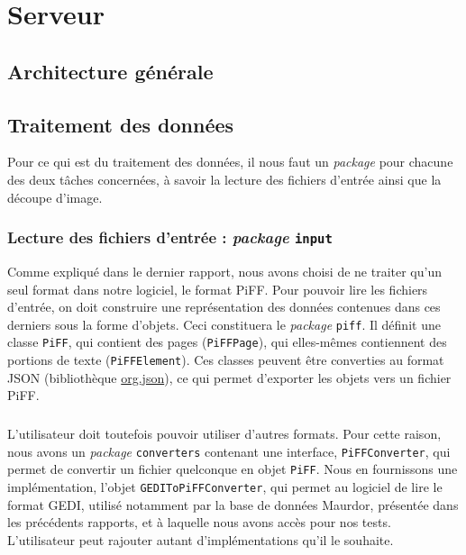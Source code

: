 \chapter{Serveur}

\section{Architecture générale}

\section{Traitement des données}

Pour ce qui est du traitement des données, il nous faut un \textit{package} pour chacune des deux tâches concernées, à savoir la lecture des fichiers d'entrée ainsi que la découpe d'image.

\subsection{Lecture des fichiers d'entrée : \textit{package} \texttt{input}}

Comme expliqué dans le dernier rapport, nous avons choisi de ne traiter qu'un seul format dans notre logiciel, le format PiFF. Pour pouvoir lire les fichiers d'entrée, on doit construire une représentation des données contenues dans ces derniers sous la forme d'objets. Ceci constituera le \textit{package} \texttt{piff}. Il définit une classe \texttt{PiFF}, qui contient des pages (\texttt{PiFFPage}), qui elles-mêmes contiennent des portions de texte (\texttt{PiFFElement}). Ces classes peuvent être converties au format JSON (bibliothèque \href{https://mvnrepository.com/artifact/org.json/json}{org.json}), ce qui permet d'exporter les objets vers un fichier PiFF.

\paragraph{}
L'utilisateur doit toutefois pouvoir utiliser d'autres formats. Pour cette raison, nous avons un \textit{package} \texttt{converters} contenant une interface, \texttt{PiFFConverter}, qui permet de convertir un fichier quelconque en objet \texttt{PiFF}. Nous en fournissons une implémentation, l'objet \texttt{GEDIToPiFFConverter}, qui permet au logiciel de lire le format GEDI, utilisé notamment par la base de données Maurdor, présentée dans les précédents rapports, et à laquelle nous avons accès pour nos tests. L'utilisateur peut rajouter autant d'implémentations qu'il le souhaite.


